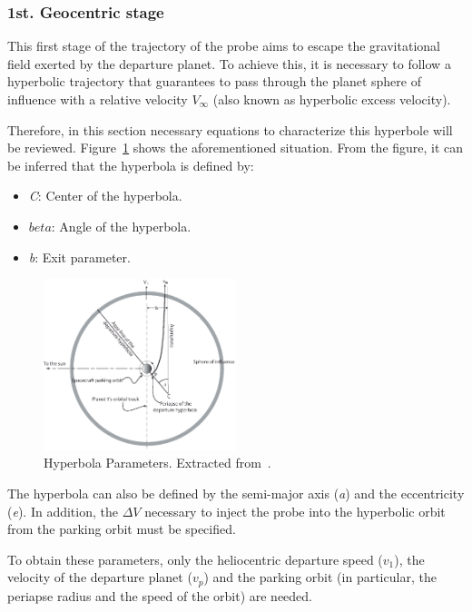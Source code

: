 \subsubsection{1st. Geocentric stage }
This first stage of the trajectory of the probe aims to escape the gravitational field exerted by the departure planet. To achieve this, it is necessary to follow a hyperbolic trajectory that guarantees to pass through the planet sphere of influence with a relative velocity $V_\infty$ (also known as hyperbolic excess velocity).

Therefore, in this section necessary equations to characterize this hyperbole will be reviewed. Figure~\ref{fig:HyperParam} shows the aforementioned situation. From the figure, it can be inferred that the hyperbola is defined by:
\begin{itemize}
	\item \textit{C}: Center of the hyperbola.
	\item $beta$: Angle of the hyperbola.
	\item \textit{b}: Exit parameter.
\end{itemize} 

\begin{figure}[H]
	\centering
	\includegraphics[width=0.5\textwidth]{././images/1stStage1} 
	\caption{Hyperbola Parameters. Extracted from~\cite{llibreVictor}.}
	\label{fig:HyperParam}
\end{figure}

The hyperbola can also be defined by the semi-major axis (\textit{a}) and the eccentricity (\textit{e}). In addition, the $\Delta V$ necessary to inject the probe into the hyperbolic orbit from the parking orbit must be specified.

To obtain these parameters, only the heliocentric departure speed ($v_1$), the velocity of the departure planet ($v_p$) and the parking orbit (in particular, the periapse radius and the speed of the orbit) are needed.


